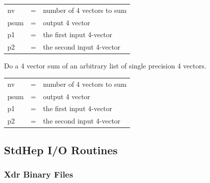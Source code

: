 \begin{description}
\begin{tabular}{lcl}
nv   & = & number of 4 vectors to sum \\
psum & = & output 4 vector \\
p1   & = & the first input 4-vector \\
p2   & = & the second input 4-vector \\
\end{tabular}

\item[sum\_4vec\_f(nv,psum,p1,p2,...)]
 Do a 4 vector sum of an arbitrary list of single precision 4 vectors.

\begin{tabular}{lcl}
nv   & = & number of 4 vectors to sum \\
psum & = & output 4 vector \\
p1   & = & the first input 4-vector \\
p2   & = & the second input 4-vector \\
\end{tabular}

\end{description}


\subsection{StdHep I/O Routines}

\subsubsection{Xdr Binary Files}

